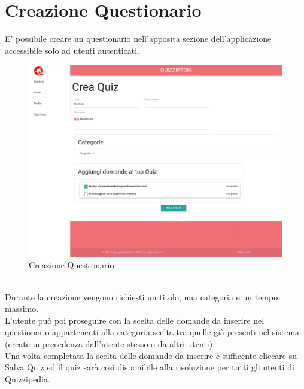 \documentclass[a4paper,11pt]{article}
\begin{document}
	\section{Creazione Questionario}
	E' possibile creare un questionario nell'apposita sezione dell'applicazione accessibile solo ad utenti autenticati.\\
	\begin{figure}[h!]
	\begin{center}
	\includegraphics[scale=0.3]{../images/quizCreationForm.png}
	\caption{Creazione Questionario}
	\end{center}
	\end{figure}
	\\
	Durante la creazione vengono richiesti un titolo, una categoria e un tempo massimo.\\ L'utente può poi proseguire con la scelta delle domande da inserire nel questionario appartenenti alla categoria scelta tra quelle già presenti nel sistema (create in precedenza dall'utente stesso o da altri utenti).\\ Una volta completata la scelta delle domande da inserire è sufficente cliccare su Salva Quiz ed il quiz sarà così disponibile alla risoluzione per tutti gli utenti di Quizzipedia.
	\newpage
\end{document}
